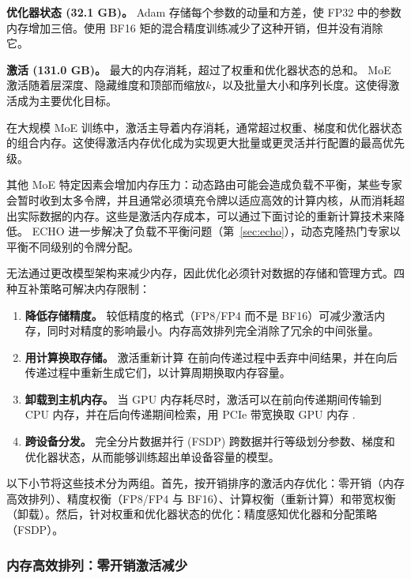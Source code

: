 \documentclass[10pt,logo,copyright]{nvidiatechreport_zh}
\begin{document}
\textbf{优化器状态 (32.1 GB)。} Adam 存储每个参数的动量和方差，使 FP32 中的参数内存增加三倍。使用 BF16 矩的混合精度训练减少了这种开销，但并没有消除它。

\textbf{激活 (131.0 GB)。} 最大的内存消耗，超过了权重和优化器状态的总和。 MoE 激活随着层深度、隐藏维度和顶部而缩放$k$，以及批量大小和序列长度。这使得激活成为主要优化目标。

\begin{notebox}
在大规模 MoE 训练中，激活主导着内存消耗，通常超过权重、梯度和优化器状态的组合内存。这使得激活内存优化成为实现更大批量或更灵活并行配置的最高优先级。
\end{notebox}

其他 MoE 特定因素会增加内存压力：动态路由可能会造成负载不平衡，某些专家会暂时收到太多令牌，并且通常必须填充令牌以适应高效的计算内核，从而消耗超出实际数据的内存。这些是激活内存成本，可以通过下面讨论的重新计算技术来降低。 ECHO 进一步解决了负载不平衡问题（第~\ref{sec:echo}），动态克隆热门专家以平衡不同级别的令牌分配。

无法通过更改模型架构来减少内存，因此优化必须针对数据的存储和管理方式。四种互补策略可解决内存限制：

\begin{enumerate}
    \item \textbf{降低存储精度。} 较低精度的格式（FP8/FP4 而不是 BF16）可减少激活内存，同时对精度的影响最小。内存高效排列完全消除了冗余的中间张量。
    \item \textbf{用计算换取存储。} 激活重新计算 \cite{chen2016training,korthikanti2022reducingactivationrecomputationlarge,beaumont2021optimal} 在前向传递过程中丢弃中间结果，并在向后传递过程中重新生成它们，以计算周期换取内存容量。
    \item \textbf{卸载到主机内存。} 当 GPU 内存耗尽时，激活可以在前向传递期间传输到 CPU 内存，并在后向传递期间检索，用 PCIe 带宽换取 GPU 内存 \cite{ren2021zerooffload}.
    \item \textbf{跨设备分发。} 完全分片数据并行 (FSDP) \cite{zhao2023pytorchfsdp,rajbhandari2020zero,rajbhandari2021zeroinf,rajbhandari2023zeropp} 跨数据并行等级划分参数、梯度和优化器状态，​​从而能够训练超出单设备容量的模型。 
\end{enumerate}

以下小节将这些技术分为两组。首先，按开销排序的激活内存优化：零开销（内存高效排列）、精度权衡（FP8/FP4 与 BF16）、计算权衡（重新计算）和带宽权衡（卸载）。然后，针对权重和优化器状态的优化：精度感知优化器和分配策略（FSDP）。

\subsubsection{内存高效排列：零开销激活减少}\label{sec:mem-eff-permute}
\end{document}

